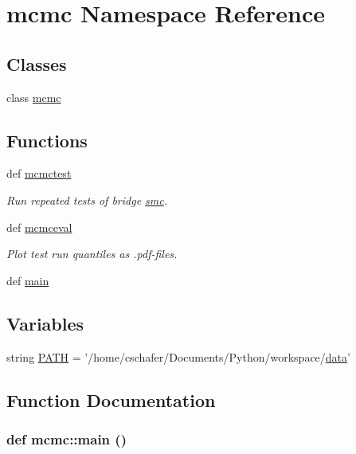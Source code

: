 \hypertarget{namespacemcmc}{
\section{mcmc Namespace Reference}
\label{namespacemcmc}
}
\subsection*{Classes}
\begin{CompactItemize}
\item 
class \hyperlink{classmcmc_1_1mcmc}{mcmc}
\end{CompactItemize}
\subsection*{Functions}
\begin{CompactItemize}
\item 
def \hyperlink{namespacemcmc_60fb0f78f00fa057c4f90a4a7ed2f111}{mcmctest}
\begin{CompactList}\small\item\em Run repeated tests of bridge \hyperlink{namespacesmc}{smc}. \item\end{CompactList}\item 
def \hyperlink{namespacemcmc_4ad3e26158616bd6ddc216215bd5198c}{mcmceval}
\begin{CompactList}\small\item\em Plot test run quantiles as .pdf-files. \item\end{CompactList}\item 
def \hyperlink{namespacemcmc_3320bffb49a11dc6dc758ebe59506f51}{main}
\end{CompactItemize}
\subsection*{Variables}
\begin{CompactItemize}
\item 
string \hyperlink{namespacemcmc_ed142f91127f59debb6ed1904b67d983}{PATH} = '/home/cschafer/Documents/Python/workspace/\hyperlink{classsampling_1_1data}{data}'
\end{CompactItemize}


\subsection{Function Documentation}
\hypertarget{namespacemcmc_3320bffb49a11dc6dc758ebe59506f51}{
\subsubsection[{main}]{\setlength{\rightskip}{0pt plus 5cm}def mcmc::main ()}}
\label{namespacemcmc_3320bffb49a11dc6dc758ebe59506f51}


